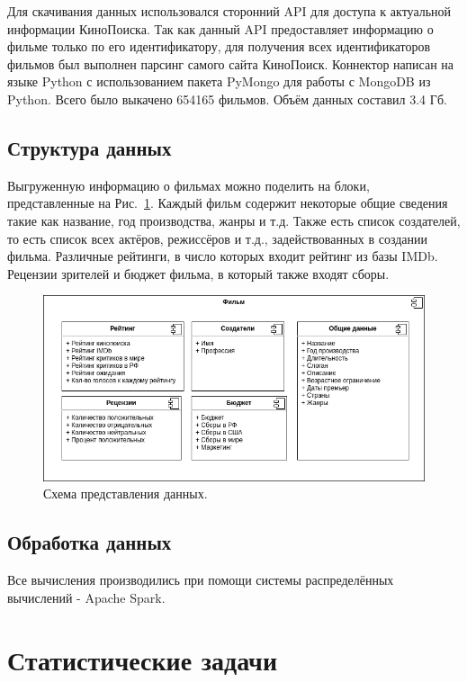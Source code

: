 \documentclass[conference]{IEEEtran}
\begin{document}
Для скачивания данных использовался сторонний API для доступа к актуальной информации КиноПоиска. Так как данный API предоставляет информацию о фильме только по его идентификатору, для получения всех идентификаторов фильмов был выполнен парсинг самого сайта КиноПоиск. Коннектор написан на языке Python с использованием пакета PyMongo для работы с MongoDB из Python. Всего было выкачено 654165 фильмов. Объём данных составил 3.4 Гб.

\subsection{Структура данных}

Выгруженную информацию о фильмах можно поделить на блоки, представленные на Рис.~\ref{fig:1}. Каждый фильм содержит некоторые общие сведения такие как название, год производства, жанры и т.д. Также есть список создателей, то есть список всех актёров, режиссёров и т.д., задействованных в создании фильма. Различные рейтинги, в число которых входит рейтинг из базы IMDb. Рецензии зрителей и бюджет фильма, в который также входят сборы.

\begin{figure}[ht!]
	\includegraphics[width=\linewidth]{../report/images/dataStructure}
	\caption{Схема представления данных.}
	\label{fig:1}
\end{figure}

\subsection{Обработка данных}

Все вычисления производились при помощи системы распределённых вычислений - Apache Spark.


\section{Статистические задачи}
\end{document}
